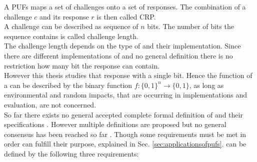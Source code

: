 A \acfp{PUF} maps a set of challenges onto a set of responses.
The combination of a challenge $c$ and its response $r$ is then called \ac{CRP}.\\
A challenge can be described as sequence of $n$ bits.
The number of bits the sequence contains is called challenge length.\\
The challenge length depends on the type of \puf and their implementation.
Since there are different implementations of \pufs and no general definition there is no restriction how many bit the response can contain.\\
However this thesis studies \pufs that response with a single bit.
Hence the function of a \puf can be described by the binary function $f: \{0, 1\}^n \to \{0,1\}$, as long as environmental and random impacts, that are occurring in \puf implementations and evaluation, are not concerned.\\
So far there exists no general accepted complete formal definition of \pufs and their specifications \cite{Becker2015ThePUFs}.
However multiple definitions are proposed but no general consensus has been reached so far \cite{Armknecht2011AFunctions,Ruhrmair2014PUFsGlance,Tehranipoor2012IntroductionTrust}.
Though some requirements must be met in order \pufs can fulfill their purpose, explained in Sec. \ref{sec:applicationsofpufs}.
\pufs can be defined by the following three requirements:


